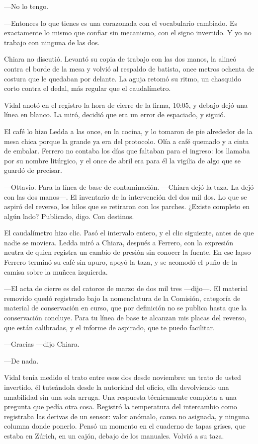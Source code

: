 ---No lo tengo.

---Entonces lo que tienes es una corazonada con el vocabulario cambiado. Es exactamente lo mismo que confiar sin mecanismo, con el signo invertido. Y yo no trabajo con ninguna de las dos.

Chiara no discutió. Levantó su copia de trabajo con las dos manos, la alineó contra el borde de la mesa y volvió al respaldo de batista, once metros ochenta de costura que le quedaban por delante. La aguja retomó su ritmo, un chasquido corto contra el dedal, más regular que el caudalímetro.

Vidal anotó en el registro la hora de cierre de la firma, 10:05, y debajo dejó una línea en blanco. La miró, decidió que era un error de espaciado, y siguió.

El café lo hizo Ledda a las once, en la cocina, y lo tomaron de pie alrededor de la mesa chica porque la grande ya era del protocolo. Olía a café quemado y a cinta de embalar. Ferrero no contaba los días que faltaban para el ingreso: los llamaba por su nombre litúrgico, y el once de abril era para él la vigilia de algo que se guardó de precisar.

---Ottavio. Para la línea de base de contaminación. ---Chiara dejó la taza. La dejó con las dos manos---. El inventario de la intervención del dos mil dos. Lo que se aspiró del reverso, los hilos que se retiraron con los parches. ¿Existe completo en algún lado? Publicado, digo. Con destinos.

El caudalímetro hizo clic. Pasó el intervalo entero, y el clic siguiente, antes de que nadie se moviera. Ledda miró a Chiara, después a Ferrero, con la expresión neutra de quien registra un cambio de presión sin conocer la fuente. En ese lapso Ferrero terminó su café sin apuro, apoyó la taza, y se acomodó el puño de la camisa sobre la muñeca izquierda.

---El acta de cierre es del catorce de marzo de dos mil tres ---dijo---. El material removido quedó registrado bajo la nomenclatura de la Comisión, categoría de material de conservación en curso, que por definición no se publica hasta que la conservación concluye. Para tu línea de base te alcanzan mis placas del reverso, que están calibradas, y el informe de aspirado, que te puedo facilitar.

---Gracias ---dijo Chiara.

---De nada.

Vidal tenía medido el trato entre esos dos desde noviembre: un trato de usted invertido, él tuteándola desde la autoridad del oficio, ella devolviendo una amabilidad sin una sola arruga. Una respuesta técnicamente completa a una pregunta que pedía otra cosa. Registró la temperatura del intercambio como registraba las derivas de un sensor: valor anómalo, causa no asignada, y ninguna columna donde ponerlo. Pensó un momento en el cuaderno de tapas grises, que estaba en Zúrich, en un cajón, debajo de los manuales. Volvió a su taza.

